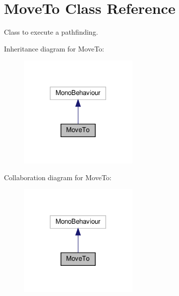 \hypertarget{classMoveTo}{}\section{Move\+To Class Reference}
\label{classMoveTo}


Class to execute a pathfinding.  




Inheritance diagram for Move\+To\+:\nopagebreak
\begin{figure}[H]
\begin{center}
\leavevmode
\includegraphics[width=164pt]{classMoveTo__inherit__graph}
\end{center}
\end{figure}


Collaboration diagram for Move\+To\+:\nopagebreak
\begin{figure}[H]
\begin{center}
\leavevmode
\includegraphics[width=164pt]{classMoveTo__coll__graph}
\end{center}
\end{figure}
